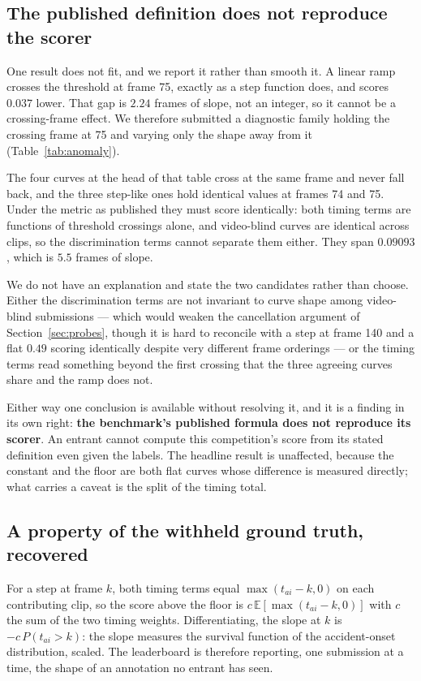 \subsection{The published definition does not reproduce the scorer}
\label{sec:anomaly}

One result does not fit, and we report it rather than smooth it. A linear ramp
crosses the threshold at frame 75, exactly as a step function does, and scores
$0.037$ lower. That gap is $2.24$ frames of slope, not an integer, so it cannot
be a crossing-frame effect. We therefore submitted a diagnostic family holding
the crossing frame at 75 and varying only the shape away from it
(Table~\ref{tab:anomaly}).

The four curves at the head of that table cross at the same frame and never
fall back, and the three step-like ones hold identical values at frames 74 and
75. Under the metric as published they must score identically: both timing
terms are functions of threshold crossings alone, and video-blind curves are
identical across clips, so the discrimination terms cannot separate them
either. They span $0.09093$, which is $5.5$ frames of slope.

We do not have an explanation and state the two candidates rather than choose.
Either the discrimination terms are not invariant to curve shape among
video-blind submissions --- which would weaken the cancellation argument of
Section~\ref{sec:probes}, though it is hard to reconcile with a step at frame
140 and a flat $0.49$ scoring identically despite very different frame
orderings --- or the timing terms read something beyond the first crossing that
the three agreeing curves share and the ramp does not.

Either way one conclusion is available without resolving it, and it is a
finding in its own right: \textbf{the benchmark's published formula does not
reproduce its scorer}. An entrant cannot compute this competition's score from
its stated definition even given the labels. The headline result is unaffected,
because the constant and the floor are both flat curves whose difference is
measured directly; what carries a caveat is the split of the timing total.

\subsection{A property of the withheld ground truth, recovered}

For a step at frame $k$, both timing terms equal $\max(t_{ai} - k, 0)$ on each
contributing clip, so the score above the floor is $c\,\mathbb{E}[\max(t_{ai} -
k, 0)]$ with $c$ the sum of the two timing weights. Differentiating, the slope
at $k$ is $-c\,P(t_{ai} > k)$: the slope measures the survival function of the
accident-onset distribution, scaled. The leaderboard is therefore reporting, one
submission at a time, the shape of an annotation no entrant has seen.

